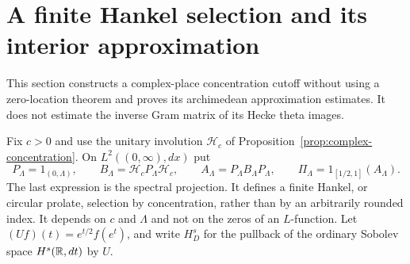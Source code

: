 \section{A finite Hankel selection and its interior approximation}
\label{sec:hankel-selection}
This section constructs a complex-place concentration cutoff without
using a zero-location theorem and proves its archimedean approximation
estimates. It does not estimate the inverse Gram matrix of its Hecke
theta images.

Fix $c>0$ and use the unitary involution $\mathcal H_c$ of
Proposition~\ref{prop:complex-concentration}. On $L^2((0,\infty),dx)$
put
\[
 P_\Lambda=1_{(0,\Lambda)},\qquad
 B_\Lambda=\mathcal H_cP_\Lambda\mathcal H_c,\qquad
 A_\Lambda=P_\Lambda B_\Lambda P_\Lambda,
 \qquad \Pi_\Lambda=1_{[1/2,1]}(A_\Lambda).
\]
The last expression is the spectral projection. It defines a finite
Hankel, or circular prolate, selection by concentration, rather than
by an arbitrarily rounded index. It depends on $c$ and $\Lambda$ and
not on the zeros of an $L$-function.
Let $(Uf)(t)=e^{t/2}f(e^t)$, and write $H_D^s$ for the pullback
of the ordinary Sobolev space $H^s(\mathbb R,dt)$ by $U$.

